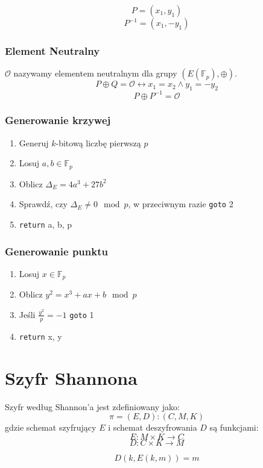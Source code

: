 \documentclass{../notatki}
\begin{document}
$$
P = (x_1, y_1)
$$
$$P^{-1} = (x_1, -y_1)
$$

\subsubsection{Element Neutralny}

$\mathcal{O}$ nazywamy elementem neutralnym dla grupy
$(E(\mathbb{F}_p), \oplus)$.
$$
P \oplus Q = \mathcal{O} \leftrightarrow x_1 = x_2 \land y_1 = -y_2
$$
$$
P \oplus P^{-1} = \mathcal{O}
$$

\subsubsection{Generowanie krzywej}

\begin{enumerate}
  \item Generuj $k$-bitową liczbę pierwszą $p$
  \item Losuj $a, b \in \mathbb{F}_p$
  \item Oblicz $\Delta_E = 4a^3 + 27b^2$
  \item Sprawdź, czy $\Delta_E \neq 0 \mod p$, w przeciwnym razie
    \texttt{goto} 2
  \item \texttt{return} a, b, p
\end{enumerate}

\subsubsection{Generowanie punktu}

\begin{enumerate}
  \item Losuj $x \in \mathbb{F}_p$
  \item Oblicz $y^2 = x^3 + ax + b \mod p$
  \item Jeśli $\frac{y^2}{p} = -1$ \texttt{goto} 1
  \item \texttt{return} x, y
\end{enumerate}

\section{Szyfr Shannona}

Szyfr według Shannon'a jest zdefiniowany jako:
$$
\pi = (E, D) : (C, M, K)
$$
gdzie schemat szyfrujący $E$ i schemat deszyfrowania $D$ są funkcjami:
$$
E: M \times K \rightarrow C
$$
$$
D: C \times K \rightarrow M
$$

$$
D(k, E(k, m)) = m
$$
\end{document}
